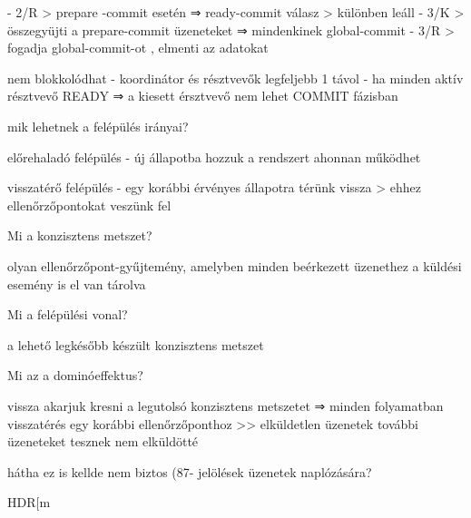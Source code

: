 \documentclass[twoside, a4paper, 12pt]{article}
\begin{document}
\begin{description}
                                        - 2/R
                                        > prepare -commit esetén ⇒ ready-commit válasz
                                        > különben leáll 
                                        - 3/K
                                        > összegyüjti a prepare-commit üzeneteket ⇒ mindenkinek global-commit
                                        - 3/R
                                        > fogadja global-commit-ot , elmenti az adatokat
                                    \item nem blokkolódhat
                                        - koordinátor és résztvevők legfeljebb 1 távol
                                        - ha minden aktív résztvevő READY ⇒ a kiesett érsztvevő nem lehet COMMIT fázisban
                                    \item  mik lehetnek a felépülés irányai?
                                    \item előrehaladó felépülés
                                        - új állapotba hozzuk a rendszert ahonnan működhet
                                    \item visszatérő felépülés
                                        - egy korábbi érvényes állapotra térünk vissza
                                        > ehhez ellenőrzőpontokat veszünk fel
                                    \item  Mi a konzisztens metszet?
                                    \item olyan ellenőrzőpont-gyűjtemény, amelyben minden beérkezett üzenethez a küldési esemény is el van tárolva
                                    \item  Mi a felépülési vonal?
                                    \item a lehető legkésőbb készült konzisztens metszet
                                    \item  Mi az a dominóeffektus?
                                    \item vissza akarjuk kresni a legutolsó konzisztens metszetet
                                        ⇒ minden folyamatban visszatérés egy korábbi ellenőrzőponthoz
                                        >> elküldetlen üzenetek további üzeneteket tesznek nem elküldötté
                                    \item hátha ez is kellde nem biztos (87-
                                        jelölések üzenetek naplózására?
                                    \item HDR[m 

\end{description}
\end{document}
